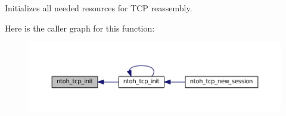 Initializes all needed resources for T\-C\-P reassembly. 



Here is the caller graph for this function\-:
\nopagebreak
\begin{figure}[H]
\begin{center}
\leavevmode
\includegraphics[width=350pt]{namespacelibntoh_a0ac2c174ee2faef679c1d5fc56a5a439_icgraph}
\end{center}
\end{figure}


